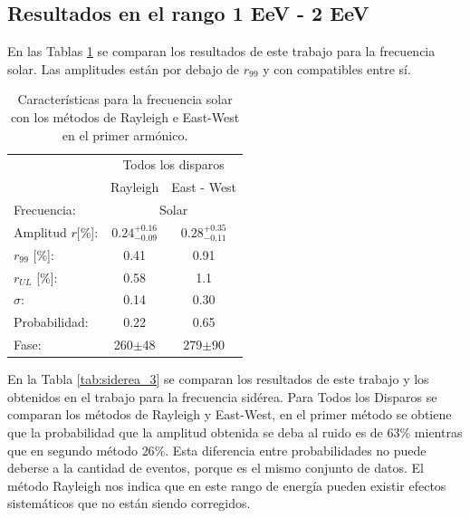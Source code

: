 \subsection{Resultados en el rango 1 EeV - 2 EeV}

 
En las Tablas \ref{tab:solar_3}  se comparan los resultados de este trabajo  para la frecuencia solar. Las amplitudes están por debajo de $r_{99}$ y con compatibles entre sí.

    \begin{table}[H]
        \begin{small}
            \begin{center}
                \begin{tabular}[c]{l|c|c|}
                    \cline{2-3}         & \multicolumn{2}{c|}{Todos los disparos} \\ \cline{2-3}
                                        & Rayleigh                      & East - West            \\\hline
\multicolumn{1}{|l|}{Frecuencia:}             &\multicolumn{2}{c|}{Solar}        \\
\multicolumn{1}{|l|}{Amplitud $r$[\%]:} & $0.24^{+0.16}_{-0.09}$        & $0.28^{+0.35}_{-0.11}$ \\
\multicolumn{1}{|l|}{$r_{99}$ [\%]:   } & 0.41                          & 0.91       \\
\multicolumn{1}{|l|}{$r_{UL}$ [\%]:   } & 0.58                          & 1.1       \\
\multicolumn{1}{|l|}{$\sigma$:        } & 0.14                          & 0.30          \\\hline
\multicolumn{1}{|l|}{Probabilidad:    } & 0.22                          & 0.65          \\
\multicolumn{1}{|l|}{Fase:            } & 260$\pm$48                    & 279$\pm$90    \\\hline
                \end{tabular}
            \end{center}
        \end{small}
        \caption{Características para la frecuencia solar con los métodos de Rayleigh  e East-West en el primer armónico.}
        \label{tab:solar_3}
    \end{table}
    
    En la Tabla \ref{tab:siderea_3} se comparan los resultados de este trabajo y los obtenidos en el trabajo \cite{Aab_2020} para la frecuencia sidérea. Para Todos los Disparos se comparan los métodos de Rayleigh y East-West, en el primer método se obtiene que la probabilidad que la amplitud obtenida se deba al ruido es de $6
    3\%$ mientras que en segundo método $26\%$. Esta diferencia entre probabilidades no puede deberse a la cantidad de eventos, porque es el mismo conjunto de datos. El método Rayleigh nos indica que en este rango de energía pueden existir efectos sistemáticos que no están siendo corregidos.


